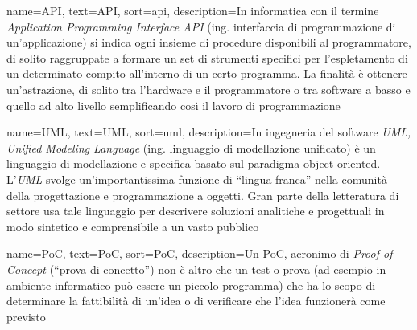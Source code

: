 
%






{
    name={API},
    text=API,
    sort=api,
    description={In informatica con il termine \emph{Application Programming Interface API} (ing. interfaccia di programmazione di un'applicazione) si indica ogni insieme di procedure disponibili al programmatore, di solito raggruppate a formare un set di strumenti specifici per l'espletamento di un determinato compito all'interno di un certo programma. La finalità è ottenere un'astrazione, di solito tra l'hardware e il programmatore o tra software a basso e quello ad alto livello semplificando così il lavoro di programmazione}
}

{
    name={UML},
    text=UML,
    sort=uml,
    description={In ingegneria del software \emph{UML, Unified Modeling Language} (ing. linguaggio di modellazione unificato) è un linguaggio di modellazione e specifica basato sul paradigma object-oriented. L'\emph{UML} svolge un'importantissima funzione di ``lingua franca'' nella comunità della progettazione e programmazione a oggetti. Gran parte della letteratura di settore usa tale linguaggio per descrivere soluzioni analitiche e progettuali in modo sintetico e comprensibile a un vasto pubblico}
}

{
    name={PoC},
    text=PoC,
    sort=PoC,
    description={Un PoC, acronimo di \emph{Proof of Concept} (“prova di concetto”) non è altro che un test o prova (ad esempio in ambiente informatico può essere un piccolo programma) che ha lo scopo di determinare la fattibilità di un'idea o di verificare che l'idea funzionerà come previsto}
}

